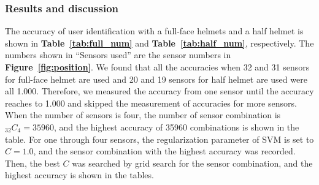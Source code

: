 \documentclass[sigchi,authordraft]{acmart}
\newcommand\figref[1]{\textbf{Figure~\ref{fig:#1}}}
\newcommand\tabref[1]{\textbf{Table~\ref{tab:#1}}}
\begin{document}
\subsubsection{Results and discussion}
The accuracy of user identification with a full-face helmets and a half helmet is shown in \tabref{full_num} and \tabref{half_num}, respectively. The numbers shown in ``Sensors used'' are the sensor numbers in \figref{position}. We found that all the accuracies when 32 and 31 sensors for full-face helmet are used and 20 and 19 sensors for half helmet are used were all 1.000. Therefore, we measured the accuracy from one sensor until the accuracy reaches to 1.000 and skipped the measurement of accuracies for more sensors.
When the number of sensors is four, the number of sensor combination is $_{32}C_{4}=35960$, and the highest accuracy of 35960 combinations is shown in the table.
For one through four sensors, the regularization parameter of SVM is set to $C=1.0$, and the sensor combination with the highest accuracy was recorded. Then, the best $C$ was searched by grid search for the sensor combination, and the highest accuracy is shown in the tables.

\end{document}

